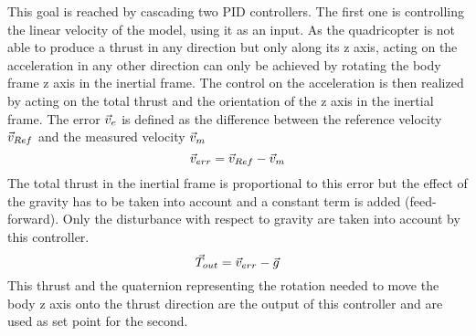 This goal is reached by cascading two PID controllers. The first one is controlling the linear velocity of the model,
using it as an input. As the quadricopter is not able to produce a thrust in any direction but only along its z axis,
acting on the acceleration in any other direction can only be achieved by rotating the body frame z axis in the
inertial frame. The control on the acceleration is then realized by acting on the total thrust and the orientation of
the z axis in the inertial frame. The error $\vec{v}_e$ is defined as the difference between the reference velocity
$\vec{v}_{Ref}$ and the measured velocity $\vec{v}_m$
\begin{equation}
	\vec{v}_{err} = \vec{v}_{Ref} - \vec{v}_m
\end{equation}
 The total thrust in the inertial frame is proportional to this error but the effect of the gravity has to be taken into
 account and a constant term is added (feed-forward). Only the disturbance with respect to gravity are taken into account by this
 controller.
 \begin{equation}
 	\vec{T}_{out} = \vec{v}_{err} - \vec{g}
 \end{equation}
This thrust and the quaternion representing the rotation needed to move the body z axis onto the thrust direction are
the output of this controller and are used as set point for the second.

